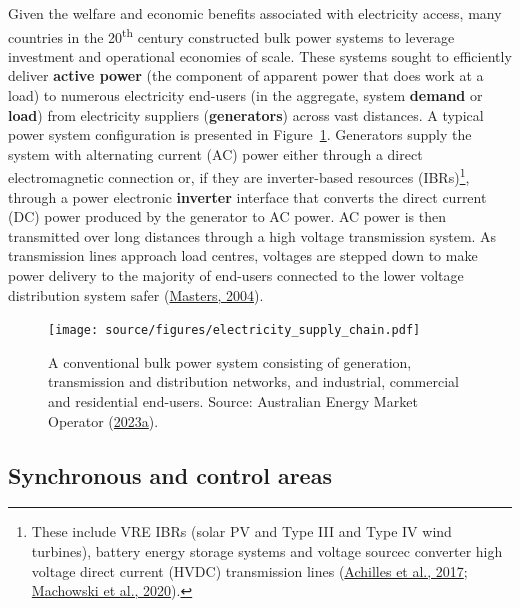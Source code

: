 \documentclass[12pt,a4paper,]{report}
\begin{document}
Given the welfare and economic benefits associated with electricity
access, many countries in the 20\textsuperscript{th} century constructed
bulk power systems to leverage investment and operational economies of
scale. These systems sought to efficiently deliver \textbf{active power}
(the component of apparent power that does work at a load) to numerous
electricity end-users (in the aggregate, system \textbf{demand} or
\textbf{load}) from electricity suppliers (\textbf{generators}) across
vast distances. A typical power system configuration is presented in
Figure~\ref{fig:elec_supply_chain}. Generators supply the system with
alternating current (AC) power either through a direct electromagnetic
connection or, if they are inverter-based resources (IBRs)\footnote{These
  include VRE IBRs (solar PV and Type III and Type IV wind turbines),
  battery energy storage systems and voltage sourcec converter high
  voltage direct current (HVDC) transmission lines
  (\protect\hyperlink{ref-achillesIntegratingInverterBasedResources2017}{Achilles
  et al., 2017};
  \protect\hyperlink{ref-machowskiPowerSystemDynamics2020}{Machowski et
  al., 2020}).}, through a power electronic \textbf{inverter} interface
that converts the direct current (DC) power produced by the generator to
AC power. AC power is then transmitted over long distances through a
high voltage transmission system. As transmission lines approach load
centres, voltages are stepped down to make power delivery to the
majority of end-users connected to the lower voltage distribution system
safer
(\protect\hyperlink{ref-mastersRenewableEfficientElectric2004}{Masters,
2004}).

\begin{figure}
\hypertarget{fig:elec_supply_chain}{%
\centering
\texttt{[image: source/figures/electricity\_supply\_chain.pdf]}
\caption[The bulk power system as an electricity supply chain]{A
conventional bulk power system consisting of generation, transmission
and distribution networks, and industrial, commercial and residential
end-users. Source: Australian Energy Market Operator
(\protect\hyperlink{ref-australianenergymarketoperatorIndustryOverview2023}{2023a}).}\label{fig:elec_supply_chain}
}
\end{figure}

\hypertarget{synchronous-and-control-areas}{%
\subsection{Synchronous and control
areas}\label{synchronous-and-control-areas}}
\end{document}
